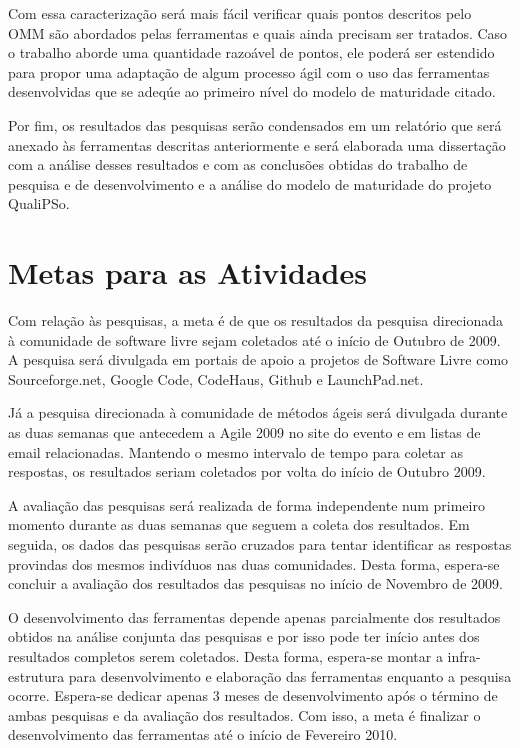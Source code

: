 Com essa caracterização será mais fácil verificar quais pontos
descritos pelo OMM são abordados pelas ferramentas e quais ainda
precisam ser tratados. Caso o trabalho aborde uma quantidade razoável
de pontos, ele poderá ser estendido para propor uma adaptação de algum
processo ágil com o uso das ferramentas desenvolvidas que se adeqúe ao
primeiro nível do modelo de maturidade citado.

Por fim, os resultados das pesquisas serão condensados em um relatório
que será anexado às ferramentas descritas anteriormente e será
elaborada uma dissertação com a análise desses resultados e com as
conclusões obtidas do trabalho de pesquisa e de desenvolvimento e a
análise do modelo de maturidade do projeto QualiPSo.

\section{Metas para as Atividades}
\label{sec:cronograma}

Com relação às pesquisas, a meta é de que os resultados da pesquisa
direcionada à comunidade de software livre sejam coletados até o início
de Outubro de 2009. A pesquisa será divulgada em portais de apoio a
projetos de Software Livre como Sourceforge.net, Google Code,
CodeHaus, Github e LaunchPad.net.

Já a pesquisa direcionada à comunidade de métodos ágeis será divulgada
durante as duas semanas que antecedem a Agile 2009 no site do evento e
em listas de email relacionadas. Mantendo o mesmo intervalo de tempo
para coletar as respostas, os resultados seriam coletados por volta do
início de Outubro 2009.

A avaliação das pesquisas será realizada de forma independente num
primeiro momento durante as duas semanas que seguem a coleta dos
resultados. Em seguida, os dados das pesquisas serão cruzados para
tentar identificar as respostas provindas dos mesmos indivíduos nas
duas comunidades. Desta forma, espera-se concluir a avaliação dos
resultados das pesquisas no início de Novembro de 2009.

O desenvolvimento das ferramentas depende apenas parcialmente dos
resultados obtidos na análise conjunta das pesquisas e por isso pode
ter início antes dos resultados completos serem coletados. Desta
forma, espera-se montar a infra-estrutura para desenvolvimento e
elaboração das ferramentas enquanto a pesquisa ocorre. Espera-se
dedicar apenas 3 meses de desenvolvimento após o término de ambas
pesquisas e da avaliação dos resultados. Com isso, a meta é finalizar
o desenvolvimento das ferramentas até o início de Fevereiro 2010.

